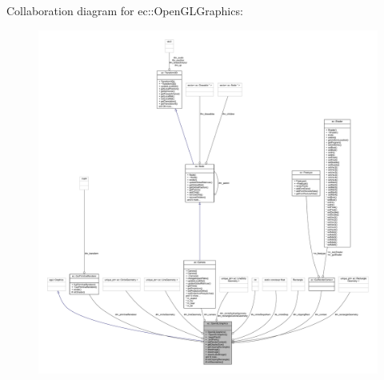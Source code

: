 Collaboration diagram for ec\+:\+:Open\+G\+L\+Graphics\+:\nopagebreak
\begin{figure}[H]
\begin{center}
\leavevmode
\includegraphics[width=350pt]{classec_1_1_open_g_l_graphics__coll__graph}
\end{center}
\end{figure}
